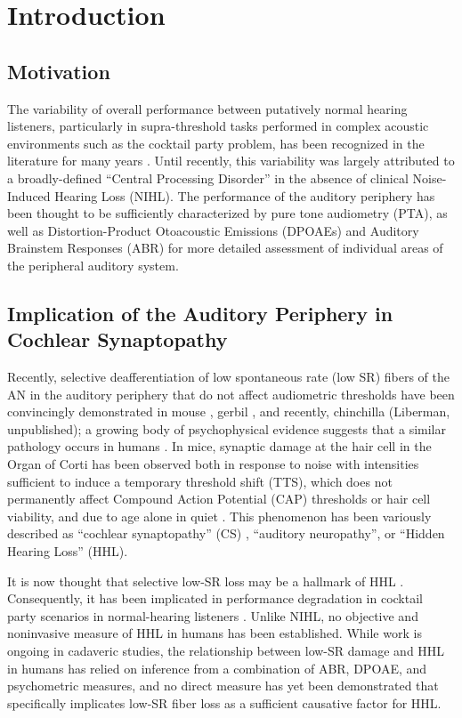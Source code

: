 \chapter{Introduction}
\label{chapter:Introduction}
\thispagestyle{myheadings}
\section{Motivation}
The variability of overall performance between putatively normal hearing listeners, particularly in supra-threshold tasks performed in complex acoustic environments such as the cocktail party problem, has been recognized in the literature for many years \citep{Cherry1953Some}.  Until recently, this variability was largely attributed to a broadly-defined ``Central Processing Disorder'' in the absence of clinical Noise-Induced Hearing Loss (NIHL). The performance of the auditory periphery has been thought to be sufficiently characterized by pure tone audiometry (PTA), as well as Distortion-Product Otoacoustic Emissions (DPOAEs) and Auditory Brainstem Responses (ABR) for more detailed assessment of individual areas of the peripheral auditory system.

\section{Implication of the Auditory Periphery in Cochlear Synaptopathy}
Recently, selective deafferentiation of low spontaneous rate (low SR) fibers of the AN in the auditory periphery that do not affect audiometric thresholds have been convincingly demonstrated in mouse \citep{Kujawa2009Adding}, gerbil \citep{Furman2013NoiseInduced}, and recently, chinchilla (Liberman, unpublished); a growing body of psychophysical evidence suggests that a similar pathology occurs in humans \citep{Bharadwaj2015Individual}.  In mice, synaptic damage at the hair cell in the Organ of Corti has been observed both in response to noise with intensities sufficient to induce a temporary threshold shift (TTS), which does not permanently affect Compound Action Potential (CAP) thresholds or hair cell viability, and due to age alone in quiet \citep{Sergeyenko2013AgeRelated,Fernandez2015Aging}. This phenomenon has been variously described as ``cochlear synaptopathy'' (CS) \citep{Bharadwaj2014Cochlear}, ``auditory neuropathy'', or ``Hidden Hearing Loss'' (HHL).  

It is now thought that selective low-SR loss may be a hallmark of HHL \citep{Furman2013NoiseInduced,Bharadwaj2014Cochlear,Bharadwaj2015Individual,Schaette2011Tinnitus}. Consequently, it has been implicated in performance degradation in cocktail party scenarios in normal-hearing listeners \citep{Bharadwaj2015Individual,Bharadwaj2014Cochlear}.  Unlike NIHL, no objective and noninvasive measure of HHL in humans has been established.  While work is ongoing in cadaveric studies, the relationship between low-SR damage and HHL in humans has relied on inference from a combination of ABR, DPOAE, and psychometric measures, and no direct measure has yet been demonstrated that specifically implicates low-SR fiber loss as a sufficient causative factor for HHL.

